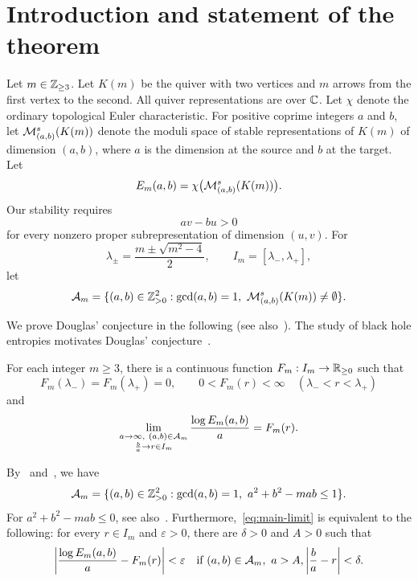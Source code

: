 \section{Introduction and statement of the theorem}\label{sec:intro}
Let $m\in\mathbb Z_{\ge3}$. Let $K(m)$ be the quiver with two vertices and $m$ arrows from the first
vertex to the second. All quiver representations are over $\mathbb C$.
Let $\chi$ denote the ordinary topological Euler characteristic.
For positive coprime integers $a$ and $b$, let $\mathcal M^s_{(a,b)}(K(m))$ denote the moduli space of stable representations of $K(m)$ of dimension $(a,b)$, where $a$ is the dimension at the source and $b$ at the target.
Let
\[
 E_m(a,b)=\chi\bigl(\mathcal M^s_{(a,b)}(K(m))\bigr).
\]
Our stability requires
\begin{equation}\label{eq:stability}
 av-bu>0
\end{equation}
for every nonzero proper subrepresentation of dimension $(u,v)$.
For
\[
 \lambda_\pm=\frac{m\pm\sqrt{m^2-4}}2,
 \qquad I_m=[\lambda_-,\lambda_+],
\]
let
\[
 \mathcal A_m=\{(a,b)\in\mathbb Z_{>0}^2:\gcd(a,b)=1,\
       \mathcal M^s_{(a,b)}(K(m))\ne\emptyset\}.
\]

We prove Douglas' conjecture in the following
\cite[Conjecture 6.1]{Weist}
(see also~\cite{Okada}).
The study of black hole entropies motivates Douglas' conjecture~\cite{CS,Denef,DM,DFR,MPS,Weist}.

\begin{theorem}\label{thm:main}
For each integer $m\geq3$, there is a continuous function
$F_m:I_m\to\mathbb R_{\ge0}$ such that
\[
 F_m(\lambda_-)=F_m(\lambda_+)=0,\qquad
 0<F_m(r)<\infty\quad(\lambda_-<r<\lambda_+)
\]
and
\begin{equation}\label{eq:main-limit}
 \lim_{\substack{a\to\infty,\ (a,b)\in\mathcal A_m\\\frac{b}{a}\to r\in I_m}}
 \frac{\log E_m(a,b)}a=F_m(r).
\end{equation}
\end{theorem}

By~\cite[Theorem 4.1]{Sch01} and~\cite[Theorem 6.1]{Sch92}, we have
\begin{equation}\label{eq:nonempty-domain}
 \mathcal A_m=\{(a,b)\in\mathbb Z_{>0}^2:
       \gcd(a,b)=1,\ a^2+b^2-mab\le1\}.
\end{equation}
For $a^2+b^2-mab\le0$, see also~\cite[Theorems 2.7(1) and 4.1(1)]{Rei}.
Furthermore,~\eqref{eq:main-limit} is equivalent to the following: for every $r\in I_m$ and $\varepsilon>0$, there are $\delta>0$ and $A>0$
such that
\[
 \left|\frac{\log E_m(a,b)}a-F_m(r)\right|<\varepsilon
 \quad\text{if }(a,b)\in\mathcal A_m,\ a>A,
       \left|\frac ba-r\right|<\delta.
\]

